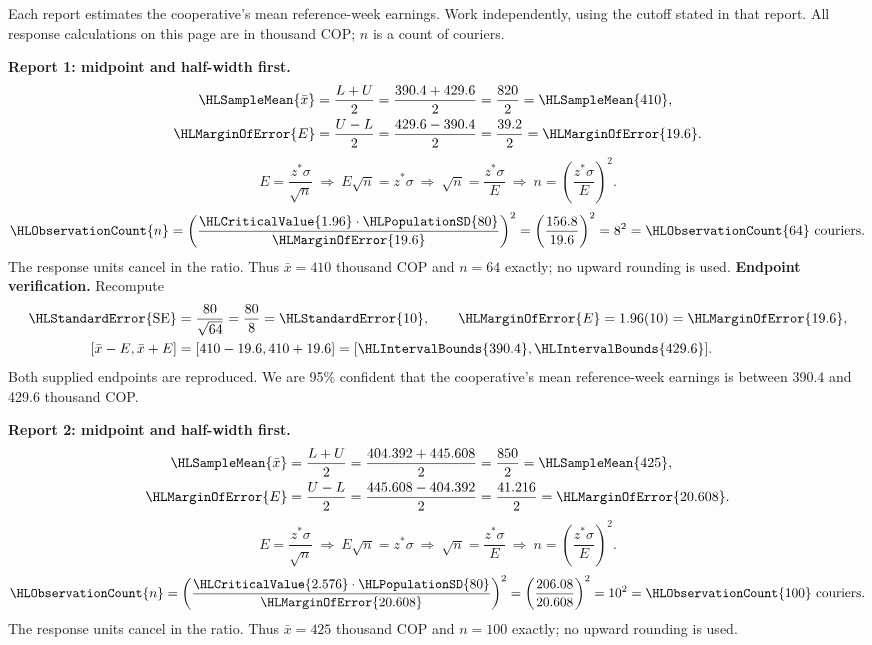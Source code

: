 Each report estimates the cooperative's mean reference-week earnings. Work independently, using the cutoff stated in that report. All response calculations on this page are in thousand COP; $n$ is a count of couriers.
\par\noindent\textbf{Report 1: midpoint and half-width first.}
\[\begin{aligned}
\HLSampleMean{\bar x}&=\frac{L+U}{2}=\frac{390.4+429.6}{2}=\frac{820}{2}=\HLSampleMean{410},\\
\HLMarginOfError{E}&=\frac{U-L}{2}=\frac{429.6-390.4}{2}=\frac{39.2}{2}=\HLMarginOfError{19.6}.
\end{aligned}\]
\[E=\frac{z^*\sigma}{\sqrt n}\ \Longrightarrow\ E\sqrt n=z^*\sigma\ \Longrightarrow\ \sqrt n=\frac{z^*\sigma}{E}\ \Longrightarrow\ n=\left(\frac{z^*\sigma}{E}\right)^2.\]
\[\HLObservationCount{n}=\left(\frac{\HLCriticalValue{1.96}\cdot\HLPopulationSD{80}}{\HLMarginOfError{19.6}}\right)^2=\left(\frac{156.8}{19.6}\right)^2=8^2=\HLObservationCount{64}\text{ couriers}.\]
The response units cancel in the ratio. Thus $\bar x=410$ thousand COP and $n=64$ exactly; no upward rounding is used.
\textbf{Endpoint verification.} Recompute
\[\begin{aligned}
\HLStandardError{\mathrm{SE}}&=\frac{80}{\sqrt{64}}=\frac{80}{8}=\HLStandardError{10},\qquad \HLMarginOfError{E}=1.96(10)=\HLMarginOfError{19.6},\\
[\bar x-E,\bar x+E]&=[410-19.6,410+19.6]=[\HLIntervalBounds{390.4},\HLIntervalBounds{429.6}].
\end{aligned}\]
Both supplied endpoints are reproduced. We are 95\% confident that the cooperative's mean reference-week earnings is between 390.4 and 429.6 thousand COP.
\par\noindent\textbf{Report 2: midpoint and half-width first.}
\[\begin{aligned}
\HLSampleMean{\bar x}&=\frac{L+U}{2}=\frac{404.392+445.608}{2}=\frac{850}{2}=\HLSampleMean{425},\\
\HLMarginOfError{E}&=\frac{U-L}{2}=\frac{445.608-404.392}{2}=\frac{41.216}{2}=\HLMarginOfError{20.608}.
\end{aligned}\]
\[E=\frac{z^*\sigma}{\sqrt n}\ \Longrightarrow\ E\sqrt n=z^*\sigma\ \Longrightarrow\ \sqrt n=\frac{z^*\sigma}{E}\ \Longrightarrow\ n=\left(\frac{z^*\sigma}{E}\right)^2.\]
\[\HLObservationCount{n}=\left(\frac{\HLCriticalValue{2.576}\cdot\HLPopulationSD{80}}{\HLMarginOfError{20.608}}\right)^2=\left(\frac{206.08}{20.608}\right)^2=10^2=\HLObservationCount{100}\text{ couriers}.\]
The response units cancel in the ratio. Thus $\bar x=425$ thousand COP and $n=100$ exactly; no upward rounding is used.
